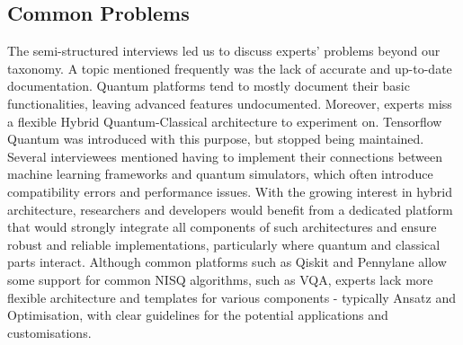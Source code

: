 \subsection{Common Problems}
The semi-structured interviews led us to discuss experts' problems beyond our taxonomy. A topic mentioned frequently was the lack of accurate and up-to-date documentation. Quantum platforms tend to mostly document their basic functionalities, leaving advanced features undocumented. Moreover, experts miss a flexible Hybrid Quantum-Classical architecture to experiment on. 
Tensorflow Quantum \cite{broughton_tensorflow_2021} was introduced with this purpose, but stopped being maintained. Several interviewees mentioned having to implement their connections between machine learning frameworks and quantum simulators, which often introduce compatibility errors and performance issues. With the growing interest in hybrid architecture, researchers and developers would benefit from a dedicated platform that would strongly integrate all components of such architectures and ensure robust and reliable implementations, particularly where quantum and classical parts interact. Although common platforms such as Qiskit and Pennylane allow some support for common NISQ algorithms, such as VQA, experts lack more flexible architecture and templates for various components - typically Ansatz and Optimisation, with clear guidelines for the potential applications and customisations.
